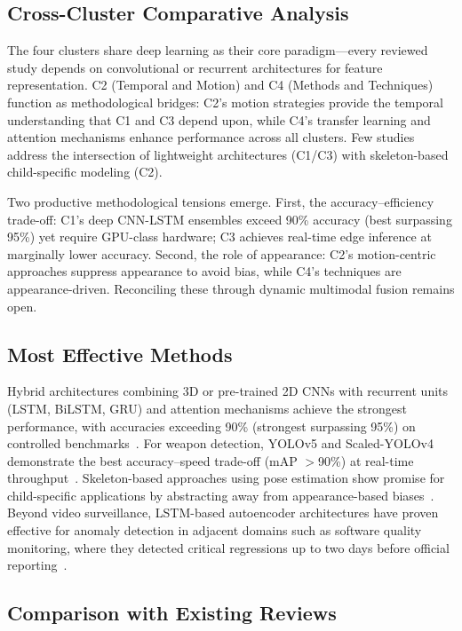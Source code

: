 \documentclass[conference]{IEEEtran}
\begin{document}
\subsection{Cross-Cluster Comparative Analysis}

The four clusters share deep learning as their core paradigm---every reviewed study depends on convolutional or recurrent architectures for feature representation. C2 (Temporal and Motion) and C4 (Methods and Techniques) function as methodological bridges: C2's motion strategies provide the temporal understanding that C1 and C3 depend upon, while C4's transfer learning and attention mechanisms enhance performance across all clusters. Few studies address the intersection of lightweight architectures (C1/C3) with skeleton-based child-specific modeling (C2).

Two productive methodological tensions emerge. First, the accuracy--efficiency trade-off: C1's deep CNN-LSTM ensembles exceed 90\% accuracy (best surpassing 95\%) yet require GPU-class hardware; C3 achieves real-time edge inference at marginally lower accuracy. Second, the role of appearance: C2's motion-centric approaches suppress appearance to avoid bias, while C4's techniques are appearance-driven. Reconciling these through dynamic multimodal fusion remains open.

\subsection{Most Effective Methods}

Hybrid architectures combining 3D or pre-trained 2D CNNs with recurrent units (LSTM, BiLSTM, GRU) and attention mechanisms achieve the strongest performance, with accuracies exceeding 90\% (strongest surpassing 95\%) on controlled benchmarks~\cite{b17,b18,b2}. For weapon detection, YOLOv5 and Scaled-YOLOv4 demonstrate the best accuracy--speed trade-off (mAP $>$90\%) at real-time throughput~\cite{b19,b9}. Skeleton-based approaches using pose estimation show promise for child-specific applications by abstracting away from appearance-based biases~\cite{b16,b20}. Beyond video surveillance, LSTM-based autoencoder architectures have proven effective for anomaly detection in adjacent domains such as software quality monitoring, where they detected critical regressions up to two days before official reporting~\cite{b24}.

\subsection{Comparison with Existing Reviews}
\end{document}
